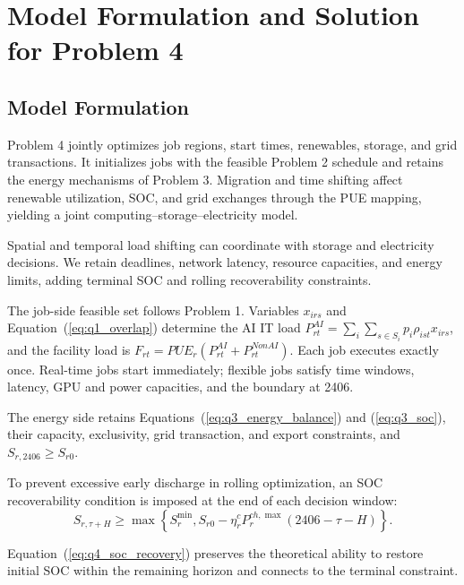 \section{Model Formulation and Solution for Problem 4}

\subsection{Model Formulation}

Problem 4 jointly optimizes job regions, start times, renewables, storage, and grid transactions. It initializes jobs with the feasible Problem 2 schedule and retains the energy mechanisms of Problem 3. Migration and time shifting affect renewable utilization, SOC, and grid exchanges through the PUE mapping, yielding a joint computing--storage--electricity model.

Spatial and temporal load shifting can coordinate with storage and electricity decisions\cite{ref9}. We retain deadlines, network latency, resource capacities, and energy limits, adding terminal SOC and rolling recoverability constraints.

The job-side feasible set follows Problem 1. Variables $x_{irs}$ and Equation~(\ref{eq:q1_overlap}) determine the AI IT load
$P_{rt}^{AI}=\sum_i\sum_{s\in S_i}p_i\rho_{ist}x_{irs}$,
and the facility load is
$F_{rt}=PUE_r(P_{rt}^{AI}+P_{rt}^{NonAI})$.
Each job executes exactly once. Real-time jobs start immediately; flexible jobs satisfy time windows, latency, GPU and power capacities, and the boundary at 2406.

The energy side retains Equations~(\ref{eq:q3_energy_balance}) and (\ref{eq:q3_soc}), their capacity, exclusivity, grid transaction, and export constraints, and $S_{r,2406}\geq S_{r0}$.

To prevent excessive early discharge in rolling optimization, an SOC recoverability condition is imposed at the end of each decision window:
\begin{equation}
	S_{r,\tau+H}
	\geq
	\max\left\{
	S_r^{\min},
	S_{r0}-
	\eta_r^cP_r^{ch,\max}(2406-\tau-H)
	\right\}.
	\label{eq:q4_soc_recovery}
\end{equation}

Equation~(\ref{eq:q4_soc_recovery}) preserves the theoretical ability to restore initial SOC within the remaining horizon and connects to the terminal constraint.


